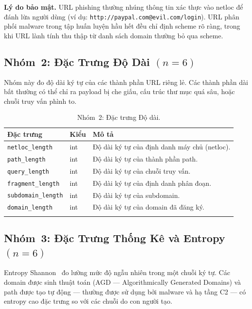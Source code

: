 \documentclass[a4paper,12pt]{article}
\begin{document}
\textbf{Lý do bảo mật.} URL phishing thường nhúng thông tin xác thực vào netloc để đánh lừa người dùng (ví dụ: \texttt{http://paypal.com@evil.com/login}). URL phân phối malware trong tập huấn luyện hầu hết đều chỉ định scheme rõ ràng, trong khi URL lành tính thu thập từ danh sách domain thường bỏ qua scheme.

\subsection{Nhóm~2: Đặc Trưng Độ Dài \texorpdfstring{$(n=6)$}{(n=6)}}
\label{sec:feat_length}

Nhóm này đo độ dài ký tự của các thành phần URL riêng lẻ. Các thành phần dài bất thường có thể chỉ ra payload bị che giấu, cấu trúc thư mục quá sâu, hoặc chuỗi truy vấn phình to.

\begin{longtable}{p{4.5cm}p{1.5cm}p{7cm}}
\toprule
\textbf{Đặc trưng} & \textbf{Kiểu} & \textbf{Mô tả} \\
\midrule
\endhead
\texttt{netloc\_length}     & int & Độ dài ký tự của định danh máy chủ (netloc). \\
\texttt{path\_length}       & int & Độ dài ký tự của thành phần path. \\
\texttt{query\_length}      & int & Độ dài ký tự của chuỗi truy vấn. \\
\texttt{fragment\_length}   & int & Độ dài ký tự của định danh phân đoạn. \\
\texttt{subdomain\_length}  & int & Độ dài ký tự của subdomain. \\
\texttt{domain\_length}     & int & Độ dài ký tự của domain đã đăng ký. \\
\bottomrule
\caption{Nhóm~2: Đặc trưng Độ dài.}
\label{tab:length}
\end{longtable}

\subsection{Nhóm~3: Đặc Trưng Thống Kê và Entropy \texorpdfstring{$(n=6)$}{(n=6)}}
\label{sec:feat_entropy}

Entropy Shannon~\cite{shannon} đo lường mức độ ngẫu nhiên trong một chuỗi ký tự. Các domain được sinh thuật toán (AGD --- Algorithmically Generated Domains) và path được tạo tự động --- thường được sử dụng bởi malware và hạ tầng C2 --- có entropy cao đặc trưng so với các chuỗi do con người tạo.
\end{document}

